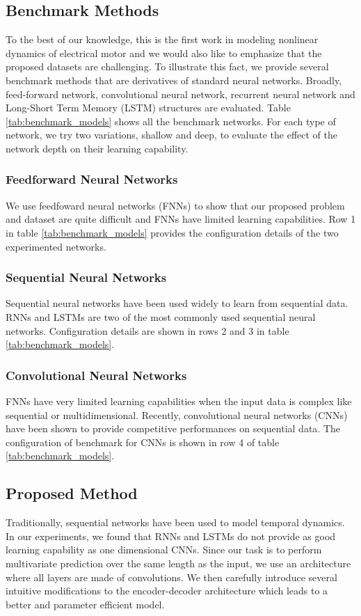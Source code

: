 \documentclass[letterpaper]{article}
\begin{document}
\subsection{Benchmark Methods}

To the best of our knowledge, this is the first work in modeling nonlinear dynamics of electrical motor and we would also like to emphasize that the proposed datasets are challenging. To illustrate this fact, we provide several benchmark methods that are derivatives of standard neural networks.  Broadly, feed-forward network, convolutional neural network, recurrent neural network and Long-Short Term Memory (LSTM) structures are evaluated. Table \ref{tab:benchmark_models} shows all the benchmark networks. For each type of network, we try two variations, shallow and deep, to evaluate the effect of the network depth on their learning capability.

\subsubsection{Feedforward Neural Networks} We use feedfoward neural networks (FNNs) to show that our proposed problem and dataset are quite difficult and FNNs have limited learning capabilities. Row 1 in table \ref{tab:benchmark_models} provides the configuration details of the two experimented networks.

\subsubsection{Sequential Neural Networks} Sequential neural networks have been used widely to learn from sequential data. RNNs and LSTMs are two of the most commonly used sequential neural networks. Configuration details are shown in rows 2 and 3 in table \ref{tab:benchmark_models}.

\subsubsection{Convolutional Neural Networks} FNNs have very limited learning capabilities when the input data is complex like sequential or multidimensional. Recently, convolutional neural networks (CNNs) have been shown to provide competitive performances on sequential data. The configuration of benchmark for CNNs is shown in row 4 of table \ref{tab:benchmark_models}.




\subsection{Proposed Method}
Traditionally, sequential networks have been used to model temporal dynamics. In our experiments, we found that RNNs and LSTMs do not provide as good learning capability as one dimensional CNNs. Since our task is to perform multivariate prediction over the same length as the input, we use an architecture where all layers are made of convolutions. We then carefully introduce several intuitive modifications to the encoder-decoder architecture which leads to a better and parameter efficient model.
\end{document}
